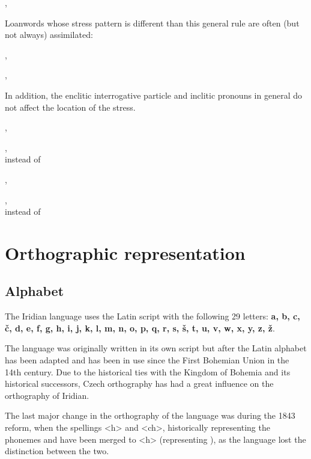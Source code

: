 \a {}, 
\xe

Loanwords whose stress pattern is different than this general rule are often (but not always) assimilated:


\pex
\a {}, \\

\a {}, \\
\xe

In addition, the enclitic interrogative particle  and inclitic pronouns in general do not affect the location of the stress.

\pex
\a {}, \\

\a {}, \\
 instead of  
\xe

\pex
\a {}, \\

\a {}, \\
 instead of  
\xe

\section{Orthographic representation}
\subsection{Alphabet}

\par The Iridian language uses the Latin script with the following 29 letters: \textbf{a, b, c, \v{c}, d, e, f, g, h, i, j, k, l, m, n, o, p, q, r, s, \v{s}, t, u, v, w, x, y, z, \v{z}}.

The language was originally written in its own script but after the Latin alphabet has been adapted and has been in use since the First Bohemian Union in the 14th century. Due to the historical ties with the Kingdom of Bohemia and its historical successors, Czech orthography has had a great influence on the orthography of Iridian.

The last major change in the orthography of the language was during the 1843 reform, when the spellings <h> and <ch>, historically representing the phonemes  and  have been merged to <h> (representing ), as the language lost the distinction between the two.

